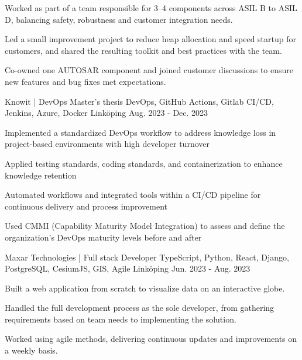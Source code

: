 \begin{cventries}
{\begin{cvitems}
			\item {Worked as part of a team responsible for 3–4 components across ASIL B to ASIL D, balancing safety, robustness and customer integration needs.}
			\item {Led a small improvement project to reduce heap allocation and speed startup for customers, and shared the resulting toolkit and best practices with the team.}
			\item {Co-owned one AUTOSAR component and joined customer discussions to ensure new features and bug fixes met expectations.}
		\end{cvitems}
	}

	\cventry
	{Knowit | DevOps Master's thesis} %
	{DevOps, GitHub Actions, Gitlab CI/CD, Jenkins, Azure, Docker} %
	{Linköping} %
	{Aug. 2023 - Dec. 2023} %
	{
		\begin{cvitems} %
			\item {Implemented a standardized DevOps workflow to address knowledge loss in project-based environments with high developer turnover}
			\item {Applied testing standards, coding standards, and containerization to enhance knowledge retention}
			\item {Automated workflows and integrated tools within a CI/CD pipeline for continuous delivery and process improvement}
			\item {Used CMMI (Capability Maturity Model Integration) to assess and define the organization’s DevOps maturity levels before and after}
		\end{cvitems}
	}

	\cventry
	{Maxar Technologies | Full stack Developer} %
	{TypeScript, Python, React, Django, PostgreSQL, CesiumJS, GIS, Agile} %
	{Linköping} %
	{Jun. 2023 - Aug. 2023} %
	{
		\begin{cvitems} %
			\item {Built a web application from scratch to visualize data on an interactive globe.}
			\item {Handled the full development process as the sole developer, from gathering requirements based on team needs to implementing the solution.}
			\item {Worked using agile methods, delivering continuous updates and improvements on a weekly basis.}
		\end{cvitems}
	}

\end{cventries}
